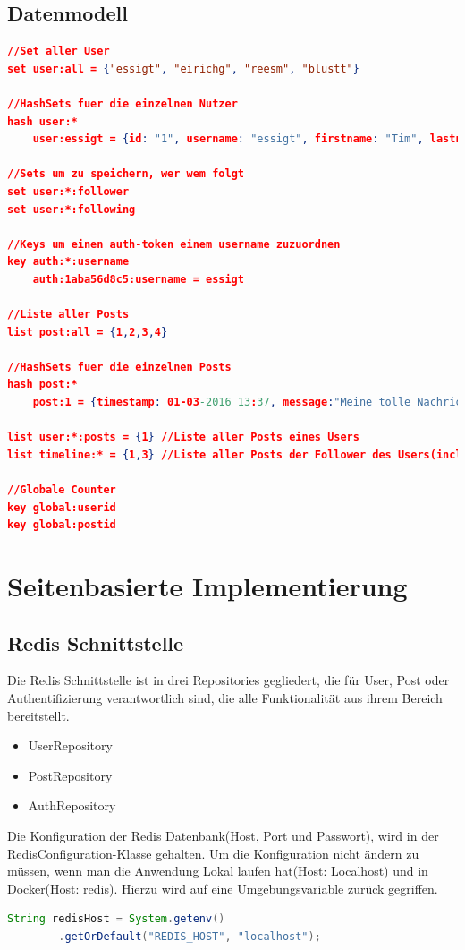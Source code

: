\documentclass[
    a4paper
]{scrreprt}
\begin{document}
    \section{Datenmodell}
        \begin{lstlisting}[language=json]
//Set aller User
set user:all = {"essigt", "eirichg", "reesm", "blustt"}

//HashSets fuer die einzelnen Nutzer
hash user:*
    user:essigt = {id: "1", username: "essigt", firstname: "Tim", lastname: "Essig", password: "xyz", auth: "1aba56d8c5"}

//Sets um zu speichern, wer wem folgt
set user:*:follower
set user:*:following

//Keys um einen auth-token einem username zuzuordnen
key auth:*:username
    auth:1aba56d8c5:username = essigt

//Liste aller Posts
list post:all = {1,2,3,4}

//HashSets fuer die einzelnen Posts
hash post:*
    post:1 = {timestamp: 01-03-2016 13:37, message:"Meine tolle Nachricht", user:"essigt"}

list user:*:posts = {1} //Liste aller Posts eines Users
list timeline:* = {1,3} //Liste aller Posts der Follower des Users(incl. seiner eigenen)

//Globale Counter
key global:userid
key global:postid
        \end{lstlisting}


    \chapter{Seitenbasierte Implementierung}
    \section{Redis Schnittstelle}
		Die Redis Schnittstelle ist in drei Repositories gegliedert, die für User, Post oder Authentifizierung verantwortlich sind, die alle Funktionalität aus ihrem Bereich bereitstellt. 
		\begin{itemize}
			\item UserRepository
			\item PostRepository
			\item AuthRepository
		\end{itemize}
		
		Die Konfiguration der Redis Datenbank(Host, Port und Passwort), wird in der RedisConfiguration-Klasse gehalten. Um die Konfiguration nicht ändern zu müssen, wenn man die Anwendung Lokal laufen hat(Host: Localhost) und in Docker(Host: redis). Hierzu wird auf eine Umgebungsvariable zurück gegriffen.
		\begin{lstlisting}[language=java]
String redisHost = System.getenv()
		.getOrDefault("REDIS_HOST", "localhost");
		\end{lstlisting}
		
\end{document}
